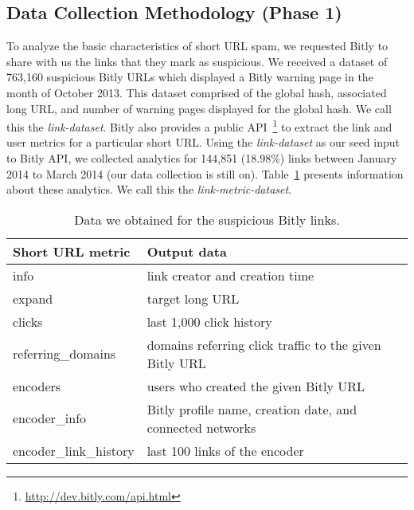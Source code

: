 \documentclass[conference]{IEEEtran}
\begin{document}
\subsection{Data Collection Methodology (Phase 1)}
\vspace{4pt}
To analyze the basic characteristics of short URL spam, we requested Bitly to share with us the links that they mark as suspicious. We received a dataset of 763,160 suspicious Bitly URLs which displayed a Bitly warning page in the month of October 2013. This dataset comprised of the global hash, associated long URL, and number of warning pages displayed for the global hash. We call this the \textit{link-dataset}. Bitly also provides a public API~\footnote{\url{http://dev.bitly.com/api.html}} to extract the link and user metrics for a particular short URL. Using the \textit{link-dataset} as our seed input to Bitly API, we collected analytics for 144,851 (18.98\%) links between January 2014 to March 2014 (our data collection is still on). Table~\ref{BitlyAnalytics} presents information about these analytics. We call this the \textit{link-metric-dataset}.
\begin{table}[h]
\small
 \begin{center}
\begin{tabular}{|p{2.5cm}|p{4cm}|}
    \hline
    {\bf Short URL metric}     & {\bf Output data}                                                             \\ \hline
    info                 & link creator and creation time                  \\ \hline
    expand               & target long URL                                                         \\ \hline
    clicks               & last 1,000 click history                                                 \\ \hline
    referring\_domains   & domains referring click traffic to the given Bitly URL                  \\ \hline
    encoders             & users who created the given Bitly URL                                        \\ \hline
    encoder\_info        & Bitly profile name, creation date, and connected networks \\ \hline
    encoder\_link\_history & last 100 links of the encoder                                 \\ \hline
    \end{tabular}
    \caption {\label{BitlyAnalytics} Data we obtained for the suspicious Bitly links.}
 \end{center}
\end{table}
\end{document}
